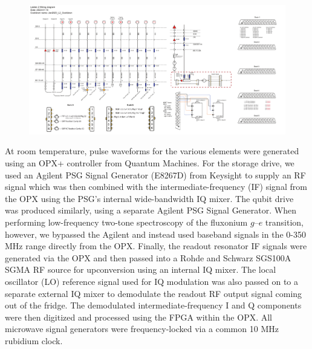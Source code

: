 \begin{figure}[h]
    \centering
    \includegraphics[width=\linewidth]{Figures/4/Microwave-Wiring-Diagram.pdf}
    \caption{}
    \label{fig:4-microwave-wiring-diagram}
\end{figure}

At room temperature, pulse waveforms for the various elements were generated using an OPX+ controller from Quantum Machines. For the storage drive, we used an Agilent PSG Signal Generator (E8267D) from Keysight to supply an RF signal which was then combined with the intermediate-frequency (IF) signal from the OPX using the PSG's internal wide-bandwidth IQ mixer. The qubit drive was produced similarly, using a separate Agilent PSG Signal Generator. When performing low-frequency two-tone spectroscopy of the fluxonium $g$--$e$ transition, however, we bypassed the Agilent and instead used baseband signals in the 0-350 MHz range directly from the OPX. Finally, the readout resonator IF signals were generated via the OPX and then passed into a Rohde and Schwarz SGS100A SGMA RF source for upconversion using an internal IQ mixer. The local oscillator (LO) reference signal used for IQ modulation was also passed on to a separate external IQ mixer to demodulate the readout RF output signal coming out of the fridge. The demodulated intermediate-frequency I and Q components were then digitized and processed using the FPGA within the OPX. All microwave signal generators were frequency-locked via a common 10 MHz rubidium clock. 


